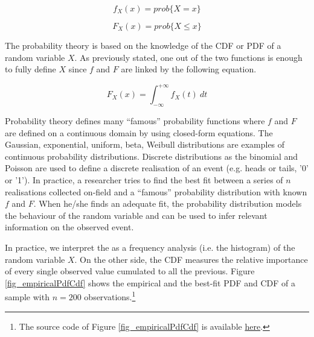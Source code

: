 \begin{equation}
f_X\left(x\right)=prob\{X=x\}
\label{eq_pdf}
\end{equation}

\begin{equation}
F_X\left(x\right)=prob\{X\le x\}
\label{eq_cdf}
\end{equation}

The probability theory is based on the knowledge of the CDF or PDF of a random variable $X$. As previously stated, one out of the two functions is enough to fully define $X$ since $f$ and $F$ are linked by the following equation.

\begin{equation}
F_X(x)=\int_{-\infty}^{+\infty}{f_X\left(t\right)\ dt}
\label{eq_cdfIntegralPdf}
\end{equation}

Probability theory defines many “famous” probability functions where $f$ and $F$ are defined on a continuous domain by using closed-form equations. The Gaussian, exponential, uniform, beta, Weibull distributions are examples of continuous probability distributions. Discrete distributions as the binomial and Poisson are used to define a discrete realisation of an event (e.g. heads or tails, '0' or '1'). In practice, a researcher tries to find the best fit between a series of $n$ realisations collected on-field and a “famous” probability distribution with known $f$ and $F$. When he/she finds an adequate fit, the probability distribution models the behaviour of the random variable and can be used to infer relevant information on the observed event.\par

In practice, we interpret the as a frequency analysis (i.e. the histogram) of the random variable $X$. On the other side, the CDF measures the relative importance of every single observed value cumulated to all the previous. Figure \ref{fig_empiricalPdfCdf} shows the empirical and the best-fit PDF and CDF of a sample with $n=200$ observations.\footnote{The source code of Figure \ref{fig_empiricalPdfCdf} is available \href{https://github.com/aletuf93/logproj/blob/master/examples/01.\%20Probability\%20Theory.ipynb}{here}.
}

